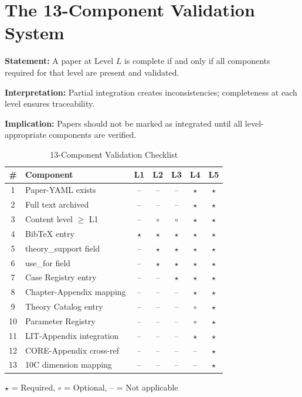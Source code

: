 \section{The 13-Component Validation System}
\label{sec:paperint-components}

\begin{tcolorbox}[colback=gray!5!white, colframe=gray!75!black,
    title=Axiom PINT-1: Component Completeness]
\textbf{Statement:} A paper at Level $L$ is complete if and only if all
components required for that level are present and validated.

\textbf{Interpretation:} Partial integration creates inconsistencies;
completeness at each level ensures traceability.

\textbf{Implication:} Papers should not be marked as integrated until
all level-appropriate components are verified.
\end{tcolorbox}

\begin{table}[htbp]
\centering
\caption{13-Component Validation Checklist}
\label{tab:13-components}
\renewcommand{\arraystretch}{1.3}
\begin{tabular}{@{}clccccc@{}}
\toprule
\textbf{\#} & \textbf{Component} & \textbf{L1} & \textbf{L2} & \textbf{L3} & \textbf{L4} & \textbf{L5} \\
\midrule
1 & Paper-YAML exists & -- & -- & -- & $\star$ & $\star$ \\
2 & Full text archived & -- & -- & -- & $\star$ & $\star$ \\
3 & Content level $\geq$ L1 & -- & $\circ$ & $\circ$ & $\star$ & $\star$ \\
4 & BibTeX entry & $\star$ & $\star$ & $\star$ & $\star$ & $\star$ \\
5 & theory\_support field & -- & $\star$ & $\star$ & $\star$ & $\star$ \\
6 & use\_for field & -- & $\star$ & $\star$ & $\star$ & $\star$ \\
7 & Case Registry entry & -- & -- & $\star$ & $\star$ & $\star$ \\
8 & Chapter-Appendix mapping & -- & -- & -- & $\star$ & $\star$ \\
9 & Theory Catalog entry & -- & -- & -- & $\circ$ & $\star$ \\
10 & Parameter Registry & -- & -- & -- & $\circ$ & $\star$ \\
11 & LIT-Appendix integration & -- & -- & -- & $\star$ & $\star$ \\
12 & CORE-Appendix cross-ref & -- & -- & -- & -- & $\star$ \\
13 & 10C dimension mapping & -- & -- & -- & -- & $\star$ \\
\bottomrule
\end{tabular}
\begin{tablenotes}
\small
\item $\star$ = Required, $\circ$ = Optional, -- = Not applicable
\end{tablenotes}
\end{table}


